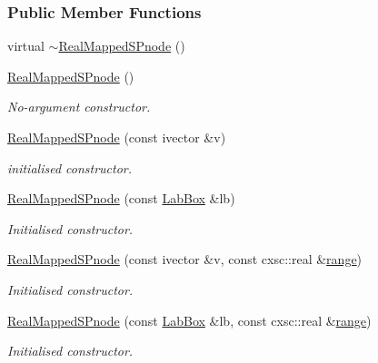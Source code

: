 \subsubsection*{\-Public \-Member \-Functions}
\begin{DoxyCompactItemize}
\item 
virtual \hyperlink{classsubpavings_1_1RealMappedSPnode_a55594a45ac82b31b5ae7592143079794}{$\sim$\-Real\-Mapped\-S\-Pnode} ()
\item 
\hyperlink{classsubpavings_1_1RealMappedSPnode_a21248dfec3fc7415a604f2f1a5d58ce6}{\-Real\-Mapped\-S\-Pnode} ()
\begin{DoxyCompactList}\small\item\em \-No-\/argument constructor. \end{DoxyCompactList}\item 
\hyperlink{classsubpavings_1_1RealMappedSPnode_a8f2de173f1eb55690cafb07020bfa5e5}{\-Real\-Mapped\-S\-Pnode} (const ivector \&v)
\begin{DoxyCompactList}\small\item\em initialised constructor. \end{DoxyCompactList}\item 
\hyperlink{classsubpavings_1_1RealMappedSPnode_a6ca684686609263ecb8579a95276e2bf}{\-Real\-Mapped\-S\-Pnode} (const \hyperlink{classLabBox}{\-Lab\-Box} \&lb)
\begin{DoxyCompactList}\small\item\em \-Initialised constructor. \end{DoxyCompactList}\item 
\hyperlink{classsubpavings_1_1RealMappedSPnode_a77bada00301c6333863d80ca002fd86c}{\-Real\-Mapped\-S\-Pnode} (const ivector \&v, const cxsc\-::real \&\hyperlink{classsubpavings_1_1MappedSPnode_a85f4e42ee09fcfa8c47835231ac3c21d}{range})
\begin{DoxyCompactList}\small\item\em \-Initialised constructor. \end{DoxyCompactList}\item 
\hyperlink{classsubpavings_1_1RealMappedSPnode_a12af9b0be5c63f0e1af1849d70b1b647}{\-Real\-Mapped\-S\-Pnode} (const \hyperlink{classLabBox}{\-Lab\-Box} \&lb, const cxsc\-::real \&\hyperlink{classsubpavings_1_1MappedSPnode_a85f4e42ee09fcfa8c47835231ac3c21d}{range})
\begin{DoxyCompactList}\small\item\em \-Initialised constructor. \end{DoxyCompactList}\item 

\end{DoxyCompactItemize}
